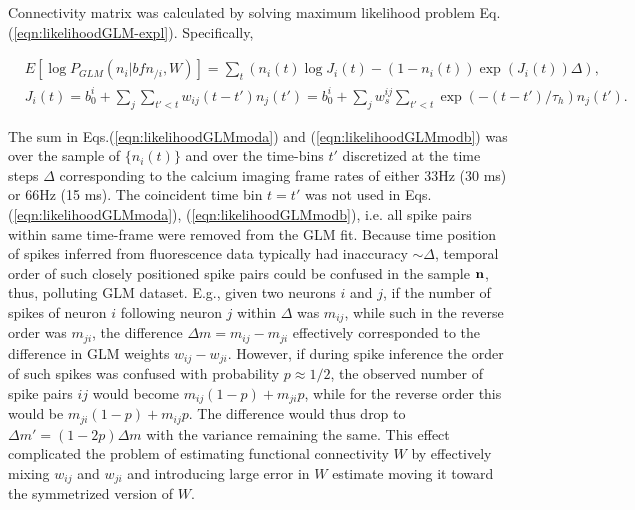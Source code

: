 Connectivity matrix was calculated by solving maximum likelihood problem Eq.(\ref{eqn:likelihoodGLM-expl}). Specifically, 

\begin{align}
\label{eqn:likelihoodGLMmoda}&E[\log P_{GLM}(n_i|{bf n}_{/i}, W)]=\sum_t \left( n_i(t) \log J_i(t) - (1-n_i(t)) \exp(J_i(t)) \Delta \right), \\
\label{eqn:likelihoodGLMmodb}&J_i(t)=b_0^i+\sum\limits_j \sum\limits_{t'<t} w_{ij}(t-t')n_{j}(t')=
b_0^i+\sum\limits_j w^{ij}_s \sum\limits_{t'<t} \exp(-(t-t')/\tau_h)n_j(t').
\end{align}

The sum in Eqs.(\ref{eqn:likelihoodGLMmoda}) and (\ref{eqn:likelihoodGLMmodb}) was over the sample of $\{n_i(t)\}$ and over the time-bins $t'$ discretized at the time steps $\Delta$ corresponding to the calcium imaging frame rates of either 33Hz (30 ms) or 66Hz (15 ms). The coincident time bin $t=t'$ was not used in Eqs.(\ref{eqn:likelihoodGLMmoda}), (\ref{eqn:likelihoodGLMmodb}), i.e.  all spike pairs within same time-frame were removed from the GLM fit.  Because time position of spikes inferred from fluorescence data typically had inaccuracy $\sim \Delta$, temporal order of such closely positioned spike pairs could be confused in the sample ${\bf n}$, thus, polluting GLM dataset.  E.g., given two neurons $i$ and $j$, if the number of spikes of neuron $i$ following neuron $j$ within $\Delta$ was $m_{ij}$, while such in the reverse order was $m_{ji}$, the difference $\Delta m = m_{ij}-m_{ji}$ effectively corresponded to the difference in GLM weights $w_{ij}-w_{ji}$. However, if during spike inference the order of such spikes was confused with probability $p\approx 1/2$, the observed number of spike pairs $ij$ would become $m_{ij}(1-p)+m_{ji}p$, while for the reverse order this would be $m_{ji}(1-p)+m_{ij}p$. The difference would thus drop to $\Delta m '= (1-2p)\Delta m$ with the variance remaining the same. This effect complicated the problem of estimating functional connectivity $W$ by effectively mixing $w_{ij}$ and $w_{ji}$ and introducing large error in $W$ estimate moving it toward the symmetrized version of $W$.

